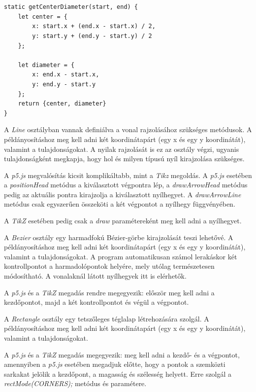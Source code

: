 \begin{lstlisting}[style=es6]
	
	
static getCenterDiameter(start, end) {
	let center = {
		x: start.x + (end.x - start.x) / 2,
		y: start.y + (end.y - start.y) / 2
	};

	let diameter = {
		x: end.x - start.x,
		y: end.y - start.y
	};
	return {center, diameter}
}
\end{lstlisting}


A \textit{Line} osztályban vannak definiálva a vonal rajzolásához szükséges metódusok. A példányosításhoz meg kell adni két koordinátapárt (egy x és egy y koordinátát), valamint a tulajdonságokat. A nyilak rajzolását is ez az osztály végzi, ugyanis tulajdonságként megkapja, hogy hol és milyen típusú nyíl kirajzolása szükséges. 

A \textit{p5.js} megvalósítás kicsit komplikáltabb, mint a \textit{Tikz} megoldás. A \textit{p5.js} esetében a \textit{positionHead} metódus a kiválasztott végpontra lép, a \textit{drawArrowHead} metódus pedig az aktuális pontra kirajzolja a kiválasztott nyílhegyet. A \textit{drawArrowLine} metódus csak egyszerűen összeköti a két végpontot a nyílhegy függvényében.

A \textit{TikZ} esetében pedig csak a \textit{draw} paramétereként meg kell adni a nyílhegyet.


A \textit{Bezier} osztály egy harmadfokú Bézier-görbe kirajzolását teszi lehetővé. A példányosításhoz meg kell adni két koordinátapárt (egy x és egy y koordinátát), valamint a tulajdonságokat. A program automatikusan számol lerakáskor két kontrollpontot a harmadolópontok helyére, mely utólag természetesen módosítható. A vonalaknál látott nyílhegyek itt is elérhetők.

A \textit{p5.js} és a \textit{TikZ} megadás rendre megegyezik: először meg kell adni a kezdőpontot, majd a két kontrollpontot és végül a végpontot.


A \textit{Rectangle} osztály egy tetszőleges téglalap létrehozására szolgál. A példányosításhoz meg kell adni két koordinátapárt (egy x és egy y koordinátát), valamint a tulajdonságokat. 

A \textit{p5.js} és a \textit{TikZ} megadás megegyezik: meg kell adni a kezdő- és a végpontot, amennyiben a \textit{p5.js} esetében megadjuk előtte, hogy a pontok a szemközti sarkakat jelölik a kezdőpont, a magasság és szélesség helyett. Erre szolgál a \textit{rectMode(CORNERS);} metódus és paramétere.

